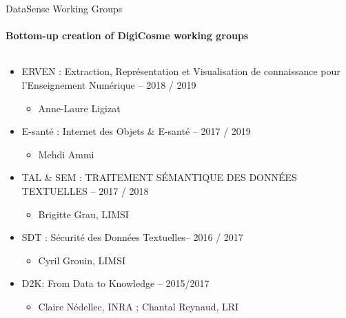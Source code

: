 \begin{frame}{DataSense Working Groups}
  \framesubtitle{Bottom-up creation of DigiCosme working groups}
  \vspace*{-8mm}


  \hspace*{-1cm}
  \begin{columns}

    \begin{column}[t]{6cm}
      \begin{itemize}
       \item {\small ERVEN : Extraction, Représentation et Visualisation de connaissance pour
l'Enseignement Numérique -- 2018 / 2019}
        \begin{itemize}
        \item Anne-Laure Ligizat
        \end{itemize}

        \item E-santé : Internet des Objets \& E-santé -- 2017 / 2019
        \begin{itemize}
        \item Mehdi Ammi
        \end{itemize}

        \item TAL \& SEM : TRAITEMENT SÉMANTIQUE DES DONNÉES TEXTUELLES -- 2017 / 2018
        \begin{itemize}
        \item  Brigitte Grau, LIMSI
        \end{itemize}

        \item SDT : Sécurité des Données Textuelles-- 2016 / 2017
        \begin{itemize}
        \item Cyril Grouin, LIMSI
        \end{itemize}

      \item D2K: From Data to Knowledge -- 2015/2017
        \begin{itemize}
        \item Claire Nédellec, INRA ; Chantal Reynaud, LRI 
        \end{itemize}


\end{itemize}
\end{column}
\end{columns}
\end{frame}

